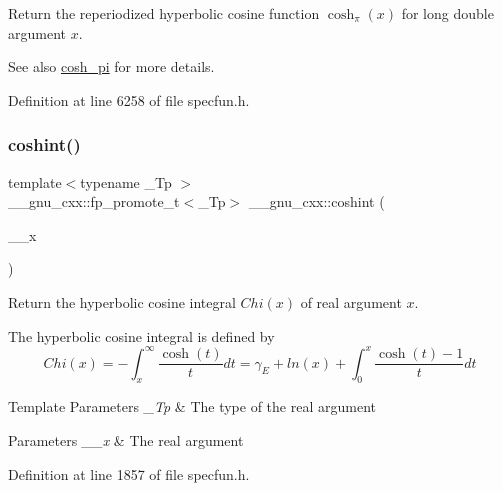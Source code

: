 Return the reperiodized hyperbolic cosine function $ \cosh_\pi(x) $ for {\ttfamily long double} argument $ x $.

\begin{DoxySeeAlso}{See also}
\hyperlink{group__gnu__math__spec__func_gaf59c68a01adfdab0f22c4fb405ab2a36}{cosh\+\_\+pi} for more details. 
\end{DoxySeeAlso}


Definition at line 6258 of file specfun.\+h.

\mbox{\label{group__gnu__math__spec__func_ga2411d513d418180285ace6650c7b7e31}} 
\subsubsection{\texorpdfstring{coshint()}{coshint()}}
{\footnotesize\ttfamily template$<$typename \+\_\+\+Tp $>$ \\
\+\_\+\+\_\+gnu\+\_\+cxx\+::fp\+\_\+promote\+\_\+t$<$\+\_\+\+Tp$>$ \+\_\+\+\_\+gnu\+\_\+cxx\+::coshint (\begin{DoxyParamCaption}\item[{\+\_\+\+Tp}]{\+\_\+\+\_\+x }\end{DoxyParamCaption})\hspace{0.3cm}{\ttfamily [inline]}}

Return the hyperbolic cosine integral $ Chi(x) $ of real argument $ x $.

The hyperbolic cosine integral is defined by \[ Chi(x) = -\int_x^\infty \frac{\cosh(t)}{t}dt = \gamma_E + ln(x) + \int_0^x \frac{\cosh(t)-1}{t}dt \]


\begin{DoxyTemplParams}{Template Parameters}
{\em \+\_\+\+Tp} & The type of the real argument \\
\hline
\end{DoxyTemplParams}

\begin{DoxyParams}{Parameters}
{\em \+\_\+\+\_\+x} & The real argument \\
\hline
\end{DoxyParams}


Definition at line 1857 of file specfun.\+h.

